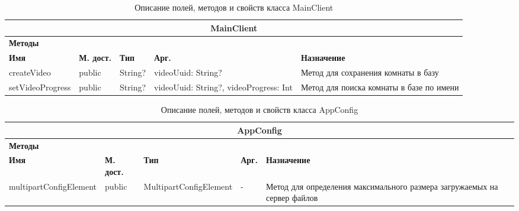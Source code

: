 \documentclass{../includes/TechDoc}
\begin{document}
    \begin{table}[h]
        \caption{\label{tab:class-MainClient-table}Описание полей, методов и свойств класса MainClient}
        \begin{tabularx}{\textwidth}{|l|l|l|l|X|}
            \hline
            \multicolumn{5}{|c|}{MainClient} \\ \hline
            \multicolumn{5}{|l|}{\textbf{Методы}} \\ \hline
            \textbf{Имя}     & \textbf{М. дост.} & \textbf{Тип} & \textbf{Арг.}                          & \textbf{Назначение}                      \\ \hline
            createVideo      & public            & String?      & videoUuid: String?                     & Метод для сохранения комнаты в базу      \\ \hline
            setVideoProgress & public            & String?      & videoUuid: String?, videoProgress: Int & Метод для поиска комнаты в базе по имени \\ \hline
        \end{tabularx}
    \end{table}

    \begin{table}[h]
        \caption{\label{tab:class-AppConfig-table}Описание полей, методов и свойств класса AppConfig}
        \begin{tabularx}{\textwidth}{|l|l|l|l|X|}
            \hline
            \multicolumn{5}{|c|}{AppConfig} \\ \hline
            \multicolumn{5}{|l|}{\textbf{Методы}} \\ \hline
            \textbf{Имя}   & \textbf{М. дост.} & \textbf{Тип} & \textbf{Арг.} & \textbf{Назначение}                      \\ \hline
            multipartConfigElement   & public            & MultipartConfigElement         & -    & Метод для определения максимального размера загружаемых на сервер файлов      \\ \hline
        \end{tabularx}
    \end{table}
\end{document}
